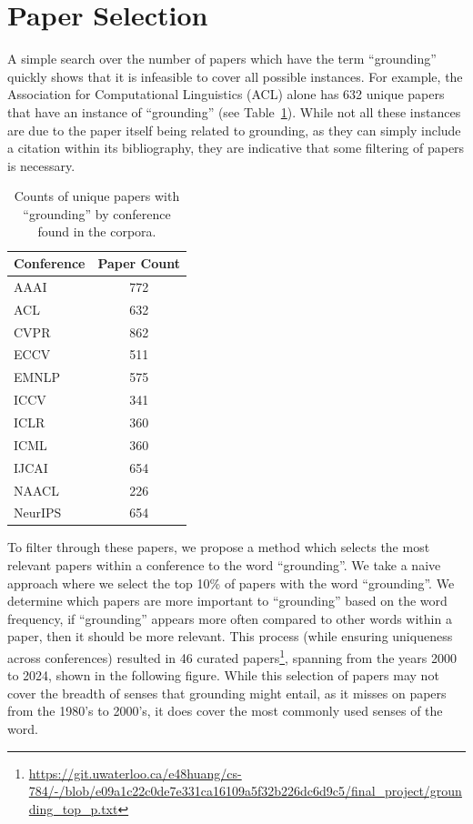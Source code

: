 \documentclass[11pt]{article}
\begin{document}
\section{Paper Selection}
A simple search over the number of papers which have the term ``grounding'' quickly shows that it is infeasible to cover all possible instances. For example, the Association for Computational Linguistics (ACL) alone has 632 unique papers that have an instance of ``grounding'' (see Table~\ref{tab:counts}). While not all these instances are due to the paper itself being related to grounding, as they can simply include a citation within its bibliography, they are indicative that some filtering of papers is necessary.

\begin{table}
  \centering
  \begin{tabular}{lc}
    \hline
    \textbf{Conference} & \textbf{Paper Count} \\
    \hline
    {AAAI}     & {772}           \\
    {ACL}     & {632}           \\
    {CVPR}     & {862}           \\
    {ECCV}     & {511}           \\
    {EMNLP}     & {575}           \\
    {ICCV}     & {341}           \\
    {ICLR}     & {360}           \\
    {ICML}     & {360}           \\
    {IJCAI}     & {654}           \\
    {NAACL}     & {226}           \\
    {NeurIPS}     & {654}           \\\hline
  \end{tabular}
  \caption{Counts of unique papers with ``grounding'' by conference found in the corpora.}
  \label{tab:counts}
\end{table}

To filter through these papers, we propose a method which selects the most relevant papers within a conference to the word ``grounding''. We take a naive approach where we select the top 10\% of papers with the word ``grounding''. We determine which papers are more important to ``grounding'' based on the word frequency, if ``grounding'' appears more often compared to other words within a paper, then it should be more relevant. This process (while ensuring uniqueness across conferences) resulted in 46 curated papers\footnote{\url{https://git.uwaterloo.ca/e48huang/cs-784/-/blob/e09a1c22c0de7e331ca16109a5f32b226dc6d9c5/final_project/grounding_top_p.txt}}, spanning from the years 2000 to 2024, shown in the following figure. While this selection of papers may not cover the breadth of senses that grounding might entail, as it misses on papers from the 1980's to 2000's, it does cover the most commonly used senses of the word.
\end{document}
